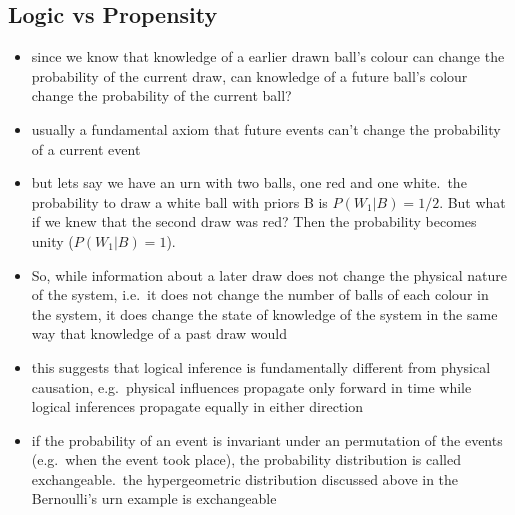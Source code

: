 \documentclass[../jaynes_prob_theory_notes.tex]{subfiles}
\begin{document}
\subsection{Logic vs Propensity}
    \begin{itemize}
        \item since we know that knowledge of a earlier drawn ball's colour  can change the probability of the current draw, can knowledge of a future ball's colour change the probability of the current ball?
        \item usually a fundamental axiom that future events can't change the probability of a current event
        \item but lets say we have an urn with two balls, one red and one white.\ the probability to draw a white ball with priors B is $P(W_1|B) = 1/2$. But what if we knew that the second draw was red? Then the probability becomes unity ($P(W_1|B) = 1$).
        \item So, while information about a later draw does not change the physical nature of the system, i.e.\ it does not change the number of balls of each colour in the system, it does change the state of knowledge of the system in the same way that knowledge of a past draw would
        \item this suggests that logical inference is fundamentally different from physical causation, e.g.\ physical influences propagate only forward in time while logical inferences propagate equally in either direction
        \item if the probability of an event is invariant under an permutation of the events (e.g.\ when the event took place), the probability distribution is called exchangeable.\ the hypergeometric distribution discussed above in the Bernoulli's urn example is exchangeable
    \end{itemize}
    
\end{document}
